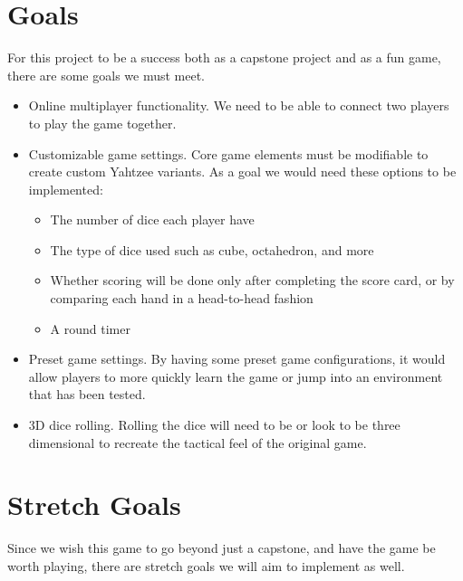 \documentclass{article}
\begin{document}
\section{Goals}

For this project to be a success both as a capstone project and as a fun game, there are some goals we must meet.

\begin{itemize}
	\item Online multiplayer functionality. We need to be able to connect two players to play the game together.
	\item Customizable game settings. Core game elements must be modifiable to create custom Yahtzee variants. As a goal we would need these options to be implemented:
	\begin{itemize}
        \item The number of dice each player have
        \item The type of dice used such as cube, octahedron, and more
        \item Whether scoring will be done only after completing the score card, or by comparing each hand in a head-to-head fashion
        \item A round timer
    \end{itemize}
	\item Preset game settings. By having some preset game configurations, it would allow players to more quickly learn the game or jump into an environment that has been tested.
	\item 3D dice rolling. Rolling the dice will need to be or look to be three dimensional to recreate the tactical feel of the original game.
\end{itemize}

\section{Stretch Goals}

Since we wish this game to go beyond just a capstone, and have the game be worth playing, there are stretch goals we will aim to implement as well.
\end{document}
